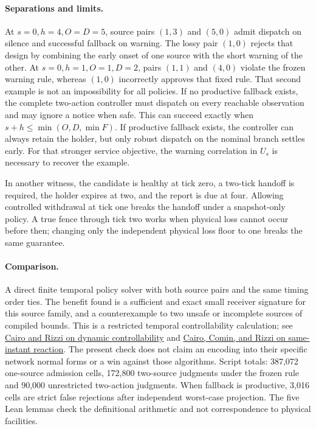 \documentclass[11pt]{article}
\begin{document}
\paragraph{Separations and limits.}
At $s=0,h=4,O=D=5$, source pairs $(1,3)$ and $(5,0)$ admit dispatch on
silence and successful fallback on warning. The lossy pair $(1,0)$ rejects
that design by combining the early onset of one source with the short
warning of the other. At $s=0,h=1,O=1,D=2$, pairs $(1,1)$ and $(4,0)$
violate the frozen warning rule, whereas $(1,0)$ incorrectly approves
that fixed rule. That second example is not an impossibility for all
policies. If no productive fallback exists, the complete two-action
controller must dispatch on every reachable observation and may ignore a
notice when safe. This can succeed exactly when
$s+h\le\min(O,D,\min F)$. If productive fallback exists, the controller
can always retain the holder, but only robust dispatch on the nominal
branch settles early. For that stronger service objective, the warning
correlation in $U_s$ is necessary to recover the example.

In another witness, the candidate is healthy at tick zero, a two-tick
handoff is required, the holder expires at two, and the report is due at
four. Allowing controlled withdrawal at tick one breaks the handoff under
a snapshot-only policy. A true fence through tick two works when physical
loss cannot occur before then; changing only the independent physical
loss floor to one breaks the same guarantee.

\paragraph{Comparison.}
A direct finite temporal policy solver with both source pairs and the
same timing order ties. The benefit found is a sufficient and exact
small receiver signature for this source family, and a counterexample
to two unsafe or incomplete sources of compiled bounds. This is a
restricted temporal controllability calculation; see
\href{https://drops.dagstuhl.de/entities/document/10.4230/LIPIcs.TIME.2017.8}{Cairo and Rizzi on dynamic controllability}
and
\href{https://arxiv.org/abs/1608.04132}{Cairo, Comin, and Rizzi on same-instant reaction}.
The present check does not claim an encoding into their specific network
normal forms or a win against those algorithms. Script totals:
387,072 one-source admission cells, 172,800 two-source judgments under
the frozen rule and 90,000 unrestricted two-action judgments. When
fallback is productive, 3,016 cells are strict false rejections after
independent worst-case projection. The five Lean lemmas check the
definitional arithmetic and not correspondence to physical facilities.
\end{document}
